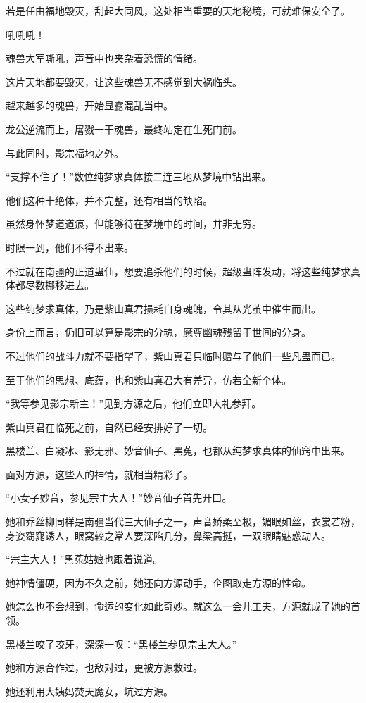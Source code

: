 \begin{this_body}
若是任由福地毁灭，刮起大同风，这处相当重要的天地秘境，可就难保安全了。

吼吼吼！

魂兽大军嘶吼，声音中也夹杂着恐慌的情绪。

这片天地都要毁灭，让这些魂兽无不感觉到大祸临头。

越来越多的魂兽，开始显露混乱当中。

龙公逆流而上，屠戮一干魂兽，最终站定在生死门前。

与此同时，影宗福地之外。

“支撑不住了！”数位纯梦求真体接二连三地从梦境中钻出来。

他们这种十绝体，并不完整，还有相当的缺陷。

虽然身怀梦道道痕，但能够待在梦境中的时间，并非无穷。

时限一到，他们不得不出来。

不过就在南疆的正道蛊仙，想要追杀他们的时候，超级蛊阵发动，将这些纯梦求真体都尽数挪移进去。

这些纯梦求真体，乃是紫山真君损耗自身魂魄，令其从光茧中催生而出。

身份上而言，仍旧可以算是影宗的分魂，魔尊幽魂残留于世间的分身。

不过他们的战斗力就不要指望了，紫山真君只临时赠与了他们一些凡蛊而已。

至于他们的思想、底蕴，也和紫山真君大有差异，仿若全新个体。

“我等参见影宗新主！”见到方源之后，他们立即大礼参拜。

紫山真君在临死之前，自然已经安排好了一切。

黑楼兰、白凝冰、影无邪、妙音仙子、黑菟，也都从纯梦求真体的仙窍中出来。

面对方源，这些人的神情，就相当精彩了。

“小女子妙音，参见宗主大人！”妙音仙子首先开口。

她和乔丝柳同样是南疆当代三大仙子之一，声音娇柔至极，媚眼如丝，衣裳若粉，身姿窈窕诱人，眼窝较之常人要深陷几分，鼻梁高挺，一双眼睛魅惑动人。

“宗主大人！”黑菟姑娘也跟着说道。

她神情僵硬，因为不久之前，她还向方源动手，企图取走方源的性命。

她怎么也不会想到，命运的变化如此奇妙。就这么一会儿工夫，方源就成了她的首领。

黑楼兰咬了咬牙，深深一叹：“黑楼兰参见宗主大人。”

她和方源合作过，也敌对过，更被方源救过。

她还利用大姨妈焚天魔女，坑过方源。


\end{this_body}
